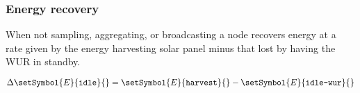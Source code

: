 \subsubsection{Energy recovery}

\newcommand{\setEnergyDeltaIdle}[2]{\Delta\setSymbol{E}{\texttt{idle}}{#2}}
\newcommand{\setEnergyHarvest}[2]{\setSymbol{E}{\texttt{harvest}}{#2}}
\newcommand{\setEnergyWUR}[2]{\setSymbol{E}{\texttt{idle-wur}}{#2}}

When not sampling, aggregating, or broadcasting a node recovers energy at a rate given by the energy harvesting solar panel minus that lost by having the WUR in standby.

\begin{equation}
	\setEnergyDeltaIdle{}{}
	= 
	\setEnergyHarvest{}{}
	-
	\setEnergyWUR{}{}
\end{equation}


